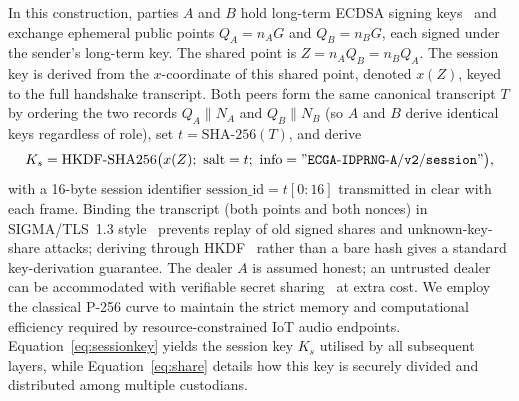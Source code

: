 \documentclass[pdflatex,sn-mathphys-num]{sn-jnl}%
\theoremstyle{thmstyleone}%
\theoremstyle{thmstyletwo}%
\theoremstyle{thmstylethree}%
\begin{document}
In this construction, parties $A$ and $B$ hold long-term ECDSA signing keys~\cite{nist2013} and exchange ephemeral public points $Q_A=n_A G$ and $Q_B=n_B G$, each signed under the sender's long-term key. The shared point is $Z = n_A Q_B = n_B Q_A$. The session key is derived from the $x$-coordinate of this shared point, denoted $x(Z)$, keyed to the full handshake transcript. Both peers form the same canonical transcript $T$ by ordering the two records $Q_A\|N_A$ and $Q_B\|N_B$ (so $A$ and $B$ derive identical keys regardless of role), set $t=\mathrm{SHA\text{-}256}(T)$, and derive
\begin{equation}
K_s = \mathrm{HKDF\text{-}SHA256}\big(x(Z);\ \mathrm{salt}=t;\ \mathrm{info}=\mathtt{"ECGA\text{-}IDPRNG\text{-}A/v2/session"}\big),
\label{eq:sessionkey}
\end{equation}
with a 16-byte session identifier $\mathrm{session\_id}=t[0{:}16]$ transmitted in clear with each frame. Binding the transcript (both points and both nonces) in SIGMA/TLS~1.3 style~\cite{krawczyk2003sigma} prevents replay of old signed shares and unknown-key-share attacks; deriving through HKDF~\cite{rfc5869} rather than a bare hash gives a standard key-derivation guarantee. The dealer $A$ is assumed honest; an untrusted dealer can be accommodated with verifiable secret sharing~\cite{feldman1987} at extra cost.
We employ the classical P-256 curve to maintain the strict memory and computational efficiency required by resource-constrained IoT audio endpoints. Equation~\eqref{eq:sessionkey} yields the session key $K_s$ utilised by all subsequent layers, while Equation~\eqref{eq:share} details how this key is securely divided and distributed among multiple custodians.
\end{document}
